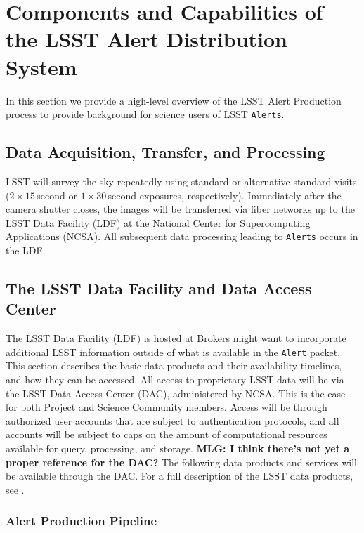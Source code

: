 \section{Components and Capabilities of the LSST Alert Distribution System}\label{sec:components}

In this section we provide a high-level overview of the LSST Alert Production process to provide background for science users of LSST \texttt{Alerts}.

\subsection{Data Acquisition, Transfer, and Processing}

LSST will survey the sky repeatedly using standard or alternative standard visits ($2\times15$\,second or $1\times30$\,second exposures, respectively).  
Immediately after the camera shutter closes, the images will be transferred via fiber networks up to the LSST Data Facility (LDF) at the National Center for Supercomputing Applications (NCSA).
All subsequent data processing leading to \texttt{Alerts} occurs in the LDF.

\subsection{The LSST Data Facility and Data Access Center}

The LSST Data Facility (LDF) is hosted at 
Brokers might want to incorporate additional LSST information outside of what is available in the {\tt Alert} packet.
This section describes the basic data products and their availability timelines, and how they can be accessed.
All access to proprietary LSST data will be via the LSST Data Access Center (DAC), administered by NCSA.
This is the case for both Project and Science Community members.
Access will be through authorized user accounts that are subject to authentication protocols, and all accounts will be subject to caps on the amount of computational resources available for query, processing, and storage.
{\bf MLG: I think there's not yet a proper reference for the DAC?} The following data products and services will be available through the DAC.
For a full description of the LSST data products, see .

\subsubsection{Alert Production Pipeline}\label{sec:AP}

